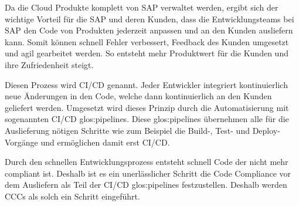 \documentclass[../main.tex]{subfiles}
\begin{document}
Da die Cloud Produkte komplett von SAP verwaltet werden, ergibt sich der wichtige Vorteil für die SAP und deren Kunden, dass die Entwicklungsteams bei SAP den Code von Produkten jederzeit anpassen und an den Kunden ausliefern kann.
Somit können schnell Fehler verbessert, Feedback des Kunden umgesetzt und agil gearbeitet werden.
So entsteht mehr Produktwert für die Kunden und ihre Zufriedenheit steigt.


Diesen Prozess wird \gls{CI/CD} genannt.
Jeder Entwickler integriert kontinuierlich neue Änderungen in den Code, welche dann kontinuierlich an den Kunden geliefert werden.
Umgesetzt wird dieses Prinzip durch die Automatisierung mit sogenannten \gls{CI/CD} \glspl{glos:pipeline}.
Diese \glspl{glos:pipeline} übernehmen alle für die Auslieferung nötigen Schritte wie zum Beispiel die Build-, Test- und Deploy-Vorgänge und ermöglichen damit erst \gls{CI/CD}.
\cite{CI/CD}

Durch den schnellen Entwicklungsprozess entsteht schnell Code der nicht mehr compliant ist.
Deshalb ist es ein unerlässlicher Schritt die Code Compliance vor dem Ausliefern als Teil der \gls{CI/CD} \glspl{glos:pipeline} festzustellen.
Deshalb werden \glspl{CCC} als solch ein Schritt eingeführt.
\end{document}
